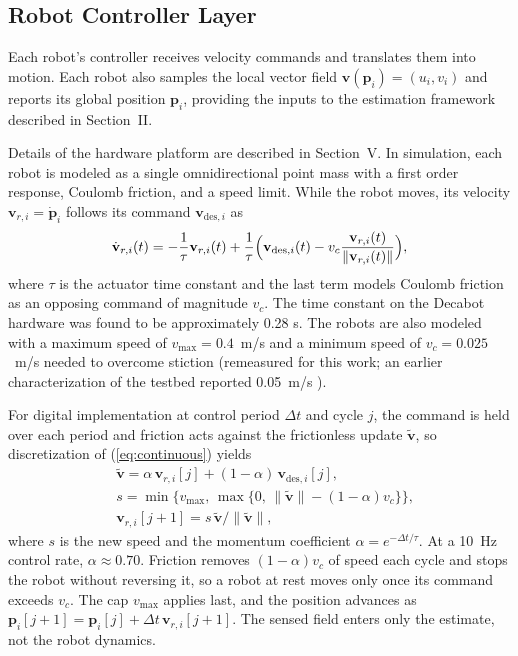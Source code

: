 \documentclass[lettersize,journal]{IEEEtran}
\begin{document}
\subsection{Robot Controller Layer}
\noindent 

Each robot's controller receives velocity commands and translates them into motion. Each robot also samples the local vector field $\mathbf{v}(\mathbf{p}_i) = (u_i, v_i)$ and reports its global position $\mathbf{p}_i$, providing the inputs to the estimation framework described in Section~II.

Details of the hardware platform are described in Section~V. In simulation, each robot is modeled as a single omnidirectional point mass with a first order response, Coulomb friction, and a speed limit. While the robot moves, its velocity $\mathbf{v}_{r,i} = \dot{\mathbf{p}}_i$ follows its command $\mathbf{v}_{\text{des},i}$ as
\begin{equation}
    \dot{\mathbf{v}}_{r,i}(t) = -\frac{1}{\tau}\mathbf{v}_{r,i}(t) + \frac{1}{\tau}\Bigl(\mathbf{v}_{\text{des},i}(t) - v_c\frac{\mathbf{v}_{r,i}(t)}{\|\mathbf{v}_{r,i}(t)\|}\Bigr),
    \label{eq:continuous}
\end{equation}
where $\tau$ is the actuator time constant \cite{4,7} and the last term models Coulomb friction as an opposing command of magnitude $v_c$. The time constant on the Decabot hardware was found to be approximately 0.28 s.  The robots are also modeled with a maximum speed of $v_{\max} = 0.4$~m/s and a minimum speed of $v_c = 0.025$~m/s needed to overcome stiction (remeasured for this work; an earlier characterization of the testbed reported 0.05~m/s \cite{22}).

For digital implementation at control period $\Delta t$ and cycle $j$, the command is held over each period and friction acts against the frictionless update $\tilde{\mathbf{v}}$, so discretization of (\ref{eq:continuous}) yields
\begin{equation}\label{eq:momentum}
\begin{split}
&\tilde{\mathbf{v}} = \alpha\,\mathbf{v}_{r,i}[j] + (1-\alpha)\,\mathbf{v}_{\text{des},i}[j],\\
&s = \min\bigl\{v_{\max},\, \max\{0,\, \|\tilde{\mathbf{v}}\| - (1-\alpha)v_c\}\bigr\},\\
&\mathbf{v}_{r,i}[j+1] = s\,\tilde{\mathbf{v}}/\|\tilde{\mathbf{v}}\|,
\end{split}
\end{equation}
where $s$ is the new speed and the momentum coefficient $\alpha = e^{-\Delta t/\tau}$. At a 10~Hz control rate, $\alpha \approx 0.70$. Friction removes $(1-\alpha)v_c$ of speed each cycle and stops the robot without reversing it, so a robot at rest moves only once its command exceeds $v_c$. The cap $v_{\max}$ applies last, and the position advances as $\mathbf{p}_i[j+1] = \mathbf{p}_i[j] + \Delta t\,\mathbf{v}_{r,i}[j+1]$. The sensed field enters only the estimate, not the robot dynamics.
\end{document}

